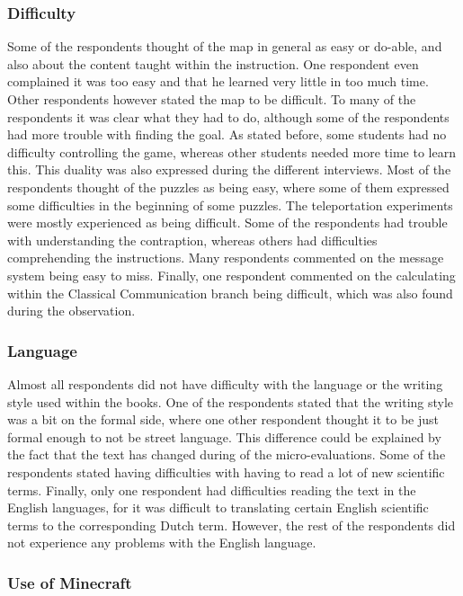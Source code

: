 \documentclass[11pt,twoside]{report} %
\begin{document}
\subsubsection{Difficulty}

Some of the respondents thought of the map in general as easy or do-able, and also about the content taught within the instruction. One respondent even complained it was too easy and that he learned very little in too much time. Other respondents however stated the map to be difficult. To many of the respondents it was clear what they had to do, although some of the respondents had more trouble with finding the goal. As stated before, some students had no difficulty controlling the game, whereas other students needed more time to learn this. This duality was also expressed during the different interviews. Most of the respondents thought of the puzzles as being easy, where some of them expressed some difficulties in the beginning of some puzzles. The teleportation experiments were mostly experienced as being difficult. Some of the respondents had trouble with understanding the contraption, whereas others had difficulties comprehending the instructions. Many respondents commented on the message system being easy to miss. Finally, one respondent commented on the calculating within the Classical Communication branch being difficult, which was also found during the observation.

\subsubsection{Language}

Almost all respondents did not have difficulty with the language or the writing style used within the books. One of the respondents stated that the writing style was a bit on the formal side, where one other respondent thought it to be just formal enough to not be street language. This difference could be explained by the fact that the text has changed during of the micro-evaluations. Some of the respondents stated having difficulties with having to read a lot of new scientific terms. Finally, only one respondent had difficulties reading the text in the English languages, for it was difficult to translating certain English scientific terms to the corresponding Dutch term. However, the rest of the respondents did not experience any problems with the English language.

\subsubsection{Use of Minecraft}
\end{document}
